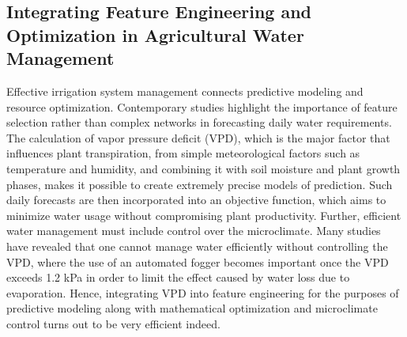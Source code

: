 \documentclass[conference]{IEEEtran}
\begin{document}
\subsection{Integrating Feature Engineering and Optimization in Agricultural Water Management}
Effective irrigation system management connects predictive modeling and resource optimization. Contemporary studies highlight the importance of feature selection rather than complex networks in forecasting daily water requirements. The calculation of vapor pressure deficit (VPD), which is the major factor that influences plant transpiration, from simple meteorological factors such as temperature and humidity, and combining it with soil moisture and plant growth phases, makes it possible to create extremely precise models of prediction. Such daily forecasts are then incorporated into an objective function, which aims to minimize water usage without compromising plant productivity\cite{vpd}.
Further, efficient water management must include control over the microclimate. Many studies have revealed that one cannot manage water efficiently without controlling the VPD, where the use of an automated fogger becomes important once the VPD exceeds 1.2 kPa in order to limit the effect caused by water loss due to evaporation. Hence, integrating VPD into feature engineering for the purposes of predictive modeling along with mathematical optimization and microclimate control turns out to be very efficient indeed\cite{inbook}\cite{vpd}.
\end{document}
